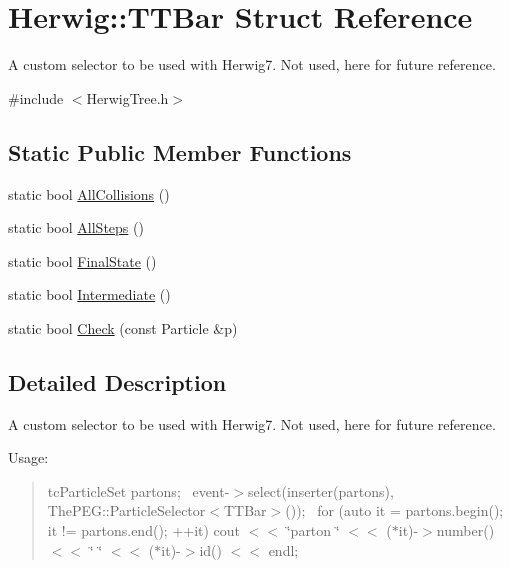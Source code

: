 \hypertarget{struct_herwig_1_1_t_t_bar}{}\section{Herwig\+:\+:T\+T\+Bar Struct Reference}
\label{struct_herwig_1_1_t_t_bar}


A custom selector to be used with Herwig7. Not used, here for future reference.  




{\ttfamily \#include $<$Herwig\+Tree.\+h$>$}

\subsection*{Static Public Member Functions}
\begin{DoxyCompactItemize}
\item 
static bool \hyperlink{struct_herwig_1_1_t_t_bar_a89fa20f428202f45107b82bd4b3eb2f7}{All\+Collisions} ()
\item 
static bool \hyperlink{struct_herwig_1_1_t_t_bar_a822820bb1819f3e6ff5fea49edc46006}{All\+Steps} ()
\item 
static bool \hyperlink{struct_herwig_1_1_t_t_bar_a3f1ce5f6cc74503e9631694f0b83ad2e}{Final\+State} ()
\item 
static bool \hyperlink{struct_herwig_1_1_t_t_bar_a3cc956e5a044094b49d4b9ca69cb15d7}{Intermediate} ()
\item 
static bool \hyperlink{struct_herwig_1_1_t_t_bar_a143709a94497e47f96e21d47d5f5bec3}{Check} (const Particle \&p)
\end{DoxyCompactItemize}


\subsection{Detailed Description}
A custom selector to be used with Herwig7. Not used, here for future reference. 

Usage\+:~\newline
\begin{quote}
tc\+Particle\+Set partons;~\newline
event-\/$>$select(inserter(partons), The\+P\+E\+G\+::\+Particle\+Selector$<$\+T\+T\+Bar$>$());~\newline
for (auto it = partons.\+begin(); it != partons.\+end(); ++it) cout $<$$<$ \char`\"{}parton \char`\"{} $<$$<$ ($\ast$it)-\/$>$number() $<$$<$ \char`\"{} \char`\"{} $<$$<$ ($\ast$it)-\/$>$id() $<$$<$ endl;~\newline
 \end{quote}


